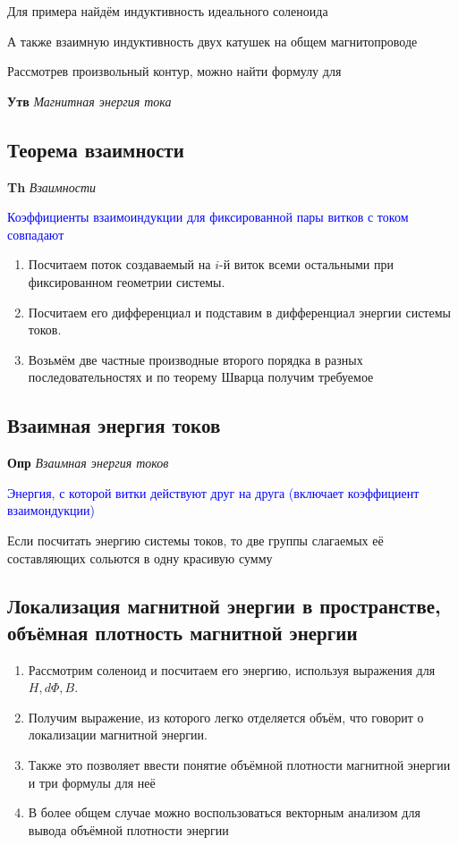 \documentclass[a4paper, 14pt]{article}
\begin{document}
    Для примера найдём индуктивность идеального соленоида
    
    А также взаимную индуктивность двух катушек на общем магнитопроводе
    
    Рассмотрев произвольный контур, можно найти формулу для
    
    \textbf{Утв} \textit{Магнитная энергия тока}
    
    \subsection{Теорема взаимности}
    
    \textbf{Th} \textit{Взаимности}
    
    \textcolor{blue}{Коэффициенты взаимоиндукции для фиксированной пары витков с током совпадают}
    
    \begin{enumerate}
        \item Посчитаем поток создаваемый на $i$-й виток всеми остальными при фиксированном геометрии системы.
        \item Посчитаем его дифференциал и подставим в дифференциал энергии системы токов.
        \item Возьмём две частные производные второго порядка в разных последовательностях и по теорему Шварца
        получим требуемое
    \end{enumerate}
    
    \subsection{Взаимная энергия токов}
    
    \textbf{Опр} \textit{Взаимная энергия токов}
    
    \textcolor{blue}{Энергия, с которой витки действуют друг на друга (включает коэффициент взаимондукции)}
    
    Если посчитать энергию системы токов, то две группы слагаемых её составляющих сольются в одну красивую сумму
    
    \subsection{Локализация магнитной энергии в пространстве, объёмная плотность магнитной энергии}
    
    \begin{enumerate}
        \item Рассмотрим соленоид и посчитаем его энергию, используя выражения для $H, d \Phi, B$.
        \item Получим выражение, из которого легко отделяется объём, что говорит о локализации магнитной энергии.
        \item Также это позволяет ввести понятие объёмной плотности магнитной энергии и три формулы для неё
        \item В более общем случае можно воспользоваться векторным анализом для вывода объёмной плотности энергии
    \end{enumerate}
    
\end{document}
